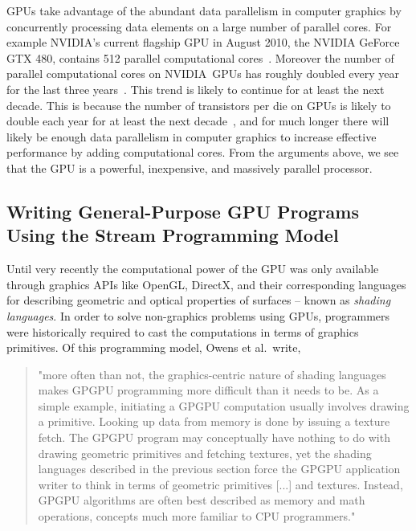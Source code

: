 GPUs take advantage of the abundant data parallelism in computer graphics by concurrently processing data elements on a large number of parallel cores. For example NVIDIA's current flagship GPU in August 2010, the NVIDIA GeForce GTX 480, contains 512 parallel computational cores~\cite{NVIDIAGeForceGTX480-2010}. Moreover the number of parallel computational cores on NVIDIA\ GPUs has roughly doubled every year for the last three years~\cite{NVIDIAGeForce9800-2010,NVIDIAGeForceGTX280-2010,NVIDIAGeForceGTX480-2010}. This trend is likely to continue for at least the next decade. This is because the number of transistors per die on GPUs is likely to double each year for at least the next decade~\cite{Owens-2005}, and for much longer there will likely be enough data parallelism in computer graphics to increase effective performance by adding computational cores. From the arguments above, we see that the GPU is a powerful, inexpensive, and massively parallel processor.

\subsection{Writing General-Purpose GPU Programs Using the Stream Programming Model}

Until very recently the computational power of the GPU was only available  through graphics APIs like OpenGL, DirectX, and their corresponding languages for describing geometric and optical properties of surfaces -- known as \emph{shading languages}. In order to solve non-graphics problems using GPUs, programmers were historically required to cast the computations in terms of graphics primitives. Of this programming model, Owens et al.\ write, 
\begin{quote}
"more often than not, the graphics-centric nature of shading languages makes GPGPU programming more difficult than it needs to be. As a simple example, initiating a GPGPU computation usually involves drawing a primitive. Looking up data from memory is done by issuing a texture fetch. The GPGPU program may conceptually have nothing to do with drawing geometric primitives and fetching textures, yet the shading languages described in the previous section force the GPGPU application writer to think in terms of geometric primitives [...] and textures. Instead, GPGPU algorithms are often best described as memory and math operations, concepts much more familiar to CPU programmers."~\cite{Owens-2005}
\end{quote}

